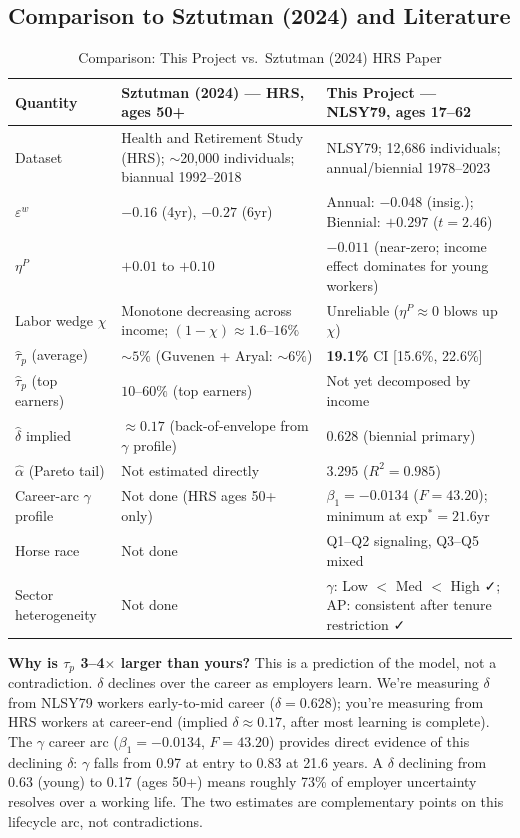 \documentclass[11pt, letterpaper]{article}
\begin{document}
\subsection{Comparison to Sztutman (2024) and Literature}

\begin{table}[h!]
\centering
\caption{Comparison: This Project vs.\ Sztutman (2024) HRS Paper}
\label{tab:comparison_sztutman}
\begin{tabular}{p{3.8cm} p{5cm} p{5cm}}
\toprule
\textbf{Quantity} & \textbf{Sztutman (2024) --- HRS, ages 50+} & \textbf{This Project --- NLSY79, ages 17--62} \\
\midrule
Dataset & Health and Retirement Study (HRS); $\sim$20,000 individuals; biannual 1992--2018 & NLSY79; 12,686 individuals; annual/biennial 1978--2023 \\[4pt]
$\varepsilon^w$ & $-0.16$ (4yr), $-0.27$ (6yr) & Annual: $-0.048$ (insig.); Biennial: $+0.297$ ($t = 2.46$) \\[4pt]
$\eta^P$ & $+0.01$ to $+0.10$ & $-0.011$ (near-zero; income effect dominates for young workers) \\[4pt]
Labor wedge $\chi$ & Monotone decreasing across income; $(1-\chi) \approx 1.6$--$16\%$ & Unreliable ($\eta^P \approx 0$ blows up $\chi$) \\[4pt]
$\hat{\tau}_p$ (average) & $\sim 5\%$ (Guvenen + Aryal: $\sim 6\%$) & \textbf{19.1\%} CI [15.6\%, 22.6\%] \\[4pt]
$\hat{\tau}_p$ (top earners) & $10$--$60\%$ (top earners) & Not yet decomposed by income \\[4pt]
$\hat{\delta}$ implied & $\approx 0.17$ (back-of-envelope from $\gamma$ profile) & $0.628$ (biennial primary) \\[4pt]
$\hat{\alpha}$ (Pareto tail) & Not estimated directly & $3.295$ ($R^2 = 0.985$) \\[4pt]
Career-arc $\gamma$ profile & Not done (HRS ages 50+ only) & $\beta_1 = -0.0134$ ($F = 43.20$); minimum at exp$^* = 21.6$yr \\[4pt]
Horse race & Not done & Q1--Q2 signaling, Q3--Q5 mixed \\[4pt]
Sector heterogeneity & Not done & $\gamma$: Low $<$ Med $<$ High ✓; AP: consistent after tenure restriction ✓ \\
\bottomrule
\end{tabular}
\end{table}

\textbf{Why is $\tau_p$ 3--4$\times$ larger than yours?} This is a prediction of the model, not a contradiction. $\delta$ declines over the career as employers learn. We're measuring $\delta$ from NLSY79 workers early-to-mid career ($\delta = 0.628$); you're measuring from HRS workers at career-end (implied $\delta \approx 0.17$, after most learning is complete). The $\gamma$ career arc ($\beta_1 = -0.0134$, $F = 43.20$) provides direct evidence of this declining $\delta$: $\gamma$ falls from 0.97 at entry to 0.83 at 21.6 years. A $\delta$ declining from 0.63 (young) to 0.17 (ages 50+) means roughly 73\% of employer uncertainty resolves over a working life. The two estimates are complementary points on this lifecycle arc, not contradictions.
\end{document}
